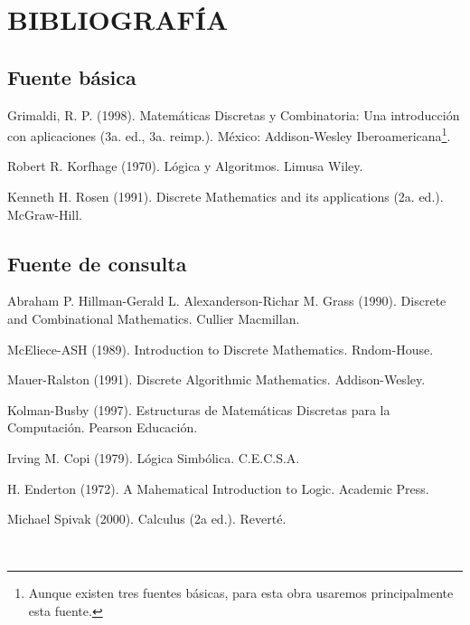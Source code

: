 \chapterspaceabove{6.75cm} %
\chapterspacebelow{7.25cm} %

\chapter*{BIBLIOGRAFÍA}

\section*{Fuente básica}

\begin{enumerate}[label={[\arabic*]}]
    \item Grimaldi, R. P. (1998). Matemáticas Discretas y Combinatoria: Una introducción con aplicaciones (3a. ed., 3a. reimp.). México: Addison-Wesley Iberoamericana\footnote{Aunque existen tres fuentes básicas, para esta obra usaremos principalmente esta fuente.}.
    \item Robert R. Korfhage (1970). Lógica y Algoritmos. Limusa Wiley.
    \item Kenneth H. Rosen (1991). Discrete Mathematics and its applications (2a. ed.). McGraw-Hill.
\end{enumerate}

\section*{Fuente de consulta}

\begin{enumerate}[resume,label={[\arabic*]}]
    \item Abraham P. Hillman-Gerald L. Alexanderson-Richar M. Grass (1990). Discrete and Combinational Mathematics. Cullier Macmillan.
    \item McEliece-ASH (1989). Introduction to Discrete Mathematics. Rndom-House.
    \item Mauer-Ralston (1991). Discrete Algorithmic Mathematics. Addison-Wesley.
    \item Kolman-Busby (1997). Estructuras de Matemáticas Discretas para la Computación. Pearson Educación.
    \item Irving M. Copi (1979). Lógica Simbólica. C.E.C.S.A.
    \item H. Enderton (1972). A Mahematical Introduction to Logic. Academic Press.
    \item Michael Spivak (2000). Calculus (2a ed.). Reverté.
\end{enumerate}

\newpage
\pagestyle{empty}
\,